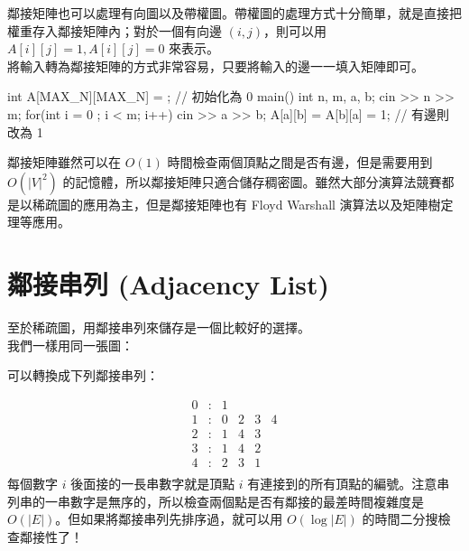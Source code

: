 鄰接矩陣也可以處理有向圖以及帶權圖。帶權圖的處理方式十分簡單，就是直接把權重存入鄰接矩陣內；對於一個有向邊 $(i, j)$，則可以用 $A[i][j] = 1, A[i][j] = 0$ 來表示。\\

將輸入轉為鄰接矩陣的方式非常容易，只要將輸入的邊一一填入矩陣即可。
\begin{C++}
int A[MAX_N][MAX_N] = {}; // 初始化為 0
main(){
    int n, m, a, b;
    cin >> n >> m;
    for(int i = 0 ; i < m; i++){
        cin >> a >> b;
        A[a][b] = A[b][a] = 1; // 有邊則改為 1
    }
}
\end{C++}

鄰接矩陣雖然可以在 $O(1)$ 時間檢查兩個頂點之間是否有邊，但是需要用到 $O(|V|^2)$ 的記憶體，所以鄰接矩陣只適合儲存稠密圖。雖然大部分演算法競賽都是以稀疏圖的應用為主，但是鄰接矩陣也有 Floyd Warshall 演算法以及矩陣樹定理等應用。

\section{鄰接串列 (Adjacency List)}
至於稀疏圖，用鄰接串列來儲存是一個比較好的選擇。\\

我們一樣用同一張圖：
\begin{center}
\end{center}

可以轉換成下列鄰接串列：

\begin{displaymath}
\begin{matrix}
0 & : & 1\\
1 & : & 0 & 2 & 3 & 4\\
2 & : & 1 & 4 & 3\\
3 & : & 1 & 4 & 2\\
4 & : & 2 & 3 & 1\\
\end{matrix}
\end{displaymath}
每個數字 $i$ 後面接的一長串數字就是頂點 $i$ 有連接到的所有頂點的編號。注意串列串的一串數字是無序的，所以檢查兩個點是否有鄰接的最差時間複雜度是 $O(|E|)$。但如果將鄰接串列先排序過，就可以用 $O(\log |E|)$ 的時間二分搜檢查鄰接性了！\\

